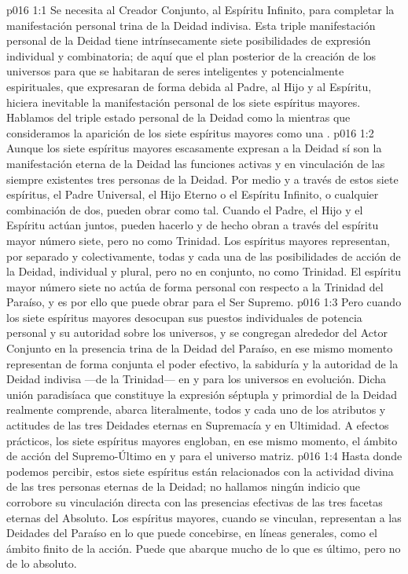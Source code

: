 \vs p016 1:1 Se necesita al Creador Conjunto, al Espíritu Infinito, para completar la manifestación personal trina de la Deidad indivisa. Esta triple manifestación personal de la Deidad tiene intrínsecamente siete posibilidades de expresión individual y combinatoria; de aquí que el plan posterior de la creación de los universos para que se habitaran de seres inteligentes y potencialmente espirituales, que expresaran de forma debida al Padre, al Hijo y al Espíritu, hiciera inevitable la manifestación personal de los siete espíritus mayores. Hablamos del triple estado personal de la Deidad como la  mientras que consideramos la aparición de los siete espíritus mayores como una .
\vs p016 1:2 Aunque los siete espíritus mayores escasamente expresan a la Deidad  sí son la manifestación eterna de la Deidad  las funciones activas y en vinculación de las siempre existentes tres personas de la Deidad. Por medio y a través de estos siete espíritus, el Padre Universal, el Hijo Eterno o el Espíritu Infinito, o cualquier combinación de dos, pueden obrar como tal. Cuando el Padre, el Hijo y el Espíritu actúan juntos, pueden hacerlo y de hecho obran a través del espíritu mayor número siete, pero no como Trinidad. Los espíritus mayores representan, por separado y colectivamente, todas y cada una de las posibilidades de acción de la Deidad, individual y plural, pero no en conjunto, no como Trinidad. El espíritu mayor número siete no actúa de forma personal con respecto a la Trinidad del Paraíso, y es por ello que puede obrar  para el Ser Supremo.
\vs p016 1:3 Pero cuando los siete espíritus mayores desocupan sus puestos individuales de potencia personal y su autoridad sobre los universos, y se congregan alrededor del Actor Conjunto en la presencia trina de la Deidad del Paraíso, en ese mismo momento representan de forma conjunta el poder efectivo, la sabiduría y la autoridad de la Deidad indivisa ---de la Trinidad--- en y para los universos en evolución. Dicha unión paradisíaca que constituye la expresión séptupla y primordial de la Deidad realmente comprende, abarca literalmente, todos y cada uno de los atributos y actitudes de las tres Deidades eternas en Supremacía y en Ultimidad. A efectos prácticos, los siete espíritus mayores engloban, en ese mismo momento, el ámbito de acción del Supremo\hyp{}Último en y para el universo matriz.
\vs p016 1:4 Hasta donde podemos percibir, estos siete espíritus están relacionados con la actividad divina de las tres personas eternas de la Deidad; no hallamos ningún indicio que corrobore su vinculación directa con las presencias efectivas de las tres facetas eternas del Absoluto. Los espíritus mayores, cuando se vinculan, representan a las Deidades del Paraíso en lo que puede concebirse, en líneas generales, como el ámbito finito de la acción. Puede que abarque mucho de lo que es último, pero no de lo absoluto.
